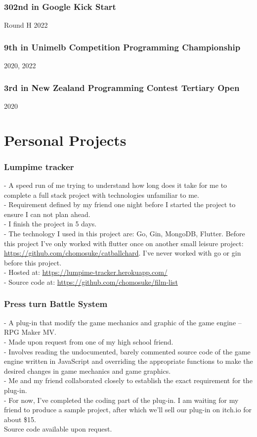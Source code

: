\documentclass[9pt]{extarticle}
\begin{document}
\subsubsection*{302nd in Google Kick Start}
Round H 2022

\subsubsection*{9th in Unimelb Competition Programming Championship}
2020, 2022

\subsubsection*{3rd in New Zealand Programming Contest Tertiary Open}
2020

\section*{Personal Projects}
\subsubsection*{Lumpime tracker}
- A speed run of me trying to understand how long does it take for me to complete a full stack project with technologies unfamiliar to me.\\
- Requirement defined by my friend one night before I started the project to ensure I can not plan ahead.\\
- I finish the project in 5 days.\\
- The technology I used in this project are: Go, Gin, MongoDB, Flutter. Before this project I’ve only worked with flutter once on another small leisure project: \url{https://github.com/chomosuke/catballchard}. I’ve never worked with go or gin before this project.\\
- Hosted at: \url{https://lumpime-tracker.herokuapp.com/}\\
- Source code at: \url{https://github.com/chomosuke/film-list}

\subsubsection*{Press turn Battle System}
- A plug-in that modify the game mechanics and graphic of the game engine – RPG Maker MV.\\
- Made upon request from one of my high school friend.\\
- Involves reading the undocumented, barely commented source code of the game engine written in JavaScript and overriding the appropriate functions to make the desired changes in game mechanics and game graphics.\\
- Me and my friend collaborated closely to establish the exact requirement for the plug-in.\\
- For now, I’ve completed the coding part of the plug-in. I am waiting for my friend to produce a sample project, after which we’ll sell our plug-in on itch.io for about \$15.\\
Source code available upon request.
\end{document}
